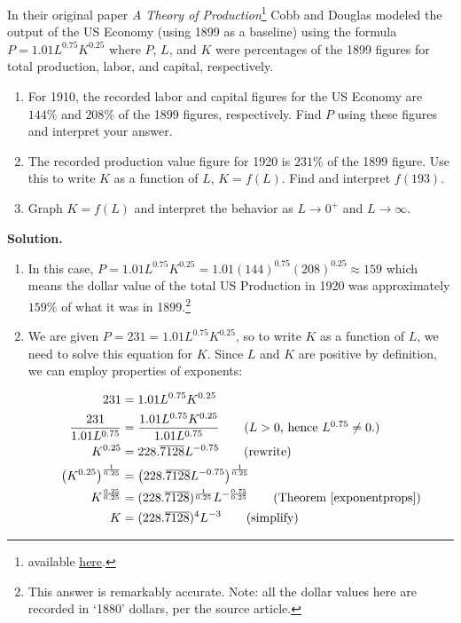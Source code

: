 \begin{ex} \label{CobbDouglasEx}  In their original paper \textit{A Theory of Production}\footnote{available \href{http://bit.ly/2dxlstt}{\underline{here}}.} Cobb and Douglas modeled the output of the US Economy (using 1899 as a baseline) using the formula $P = 1.01 L^{0.75} K^{0.25}$ where $P$, $L$, and $K$ were percentages of the 1899 figures for total production, labor, and capital, respectively.

\begin{enumerate}

\item  For 1910, the recorded labor and capital figures for the US Economy are $144 \%$ and $208 \%$ of the 1899 figures, respectively.  Find $P$ using these figures and interpret your answer.

\item  The recorded production value figure for 1920 is $231 \%$ of the 1899 figure.  Use this to write $K$ as a function of $L$, $K = f(L)$.  Find and interpret $f(193)$.

\item  Graph $K = f(L)$ and interpret the behavior as $L \rightarrow 0^{+}$ and $L \rightarrow \infty$.


\end{enumerate}

{\bf Solution.}

\begin{enumerate}

\item  In this case, $P = 1.01 L^{0.75} K^{0.25} = 1.01 (144)^{0.75} (208)^{0.25} \approx 159$ which means the dollar value of the total US Production in 1920 was approximately $159 \%$ of what it was in 1899.\footnote{This answer is remarkably accurate. Note:  all the dollar values here are recorded in `1880' dollars, per the source article. }  

\item We are given $P = 231 = 1.01L^{0.75} K^{0.25}$, so to write $K$ as a function of $L$, we need to solve this equation for $K$.  Since $L$ and $K$ are positive by definition, we can employ properties of exponents:

\begin{align*}
231 & = 1.01 L^{0.75} K^{0.25} \\
\dfrac{231}{1.01 L^{0.75}} & = \dfrac{1.01 L^{0.75} K^{0.25}}{1.01 L^{0.75}} \tag{$L>0$, hence $L^{0.75} \neq 0$.}\\
K^{0.25} & = 228.\overline{7128}L^{-0.75} \tag{rewrite} \\
\left(K^{0.25}\right)^{\frac{1}{0.25}} & = \left(228.\overline{7128}L^{-0.75}\right)^{\frac{1}{0.25}} \\
K^{\frac{0.25}{0.25}} & = (228.\overline{7128})^{\frac{1}{0.25}} L^{-\frac{0.75}{0.25}} \tag{Theorem  \ref{exponentprops}} \\
K & = (228.\overline{7128})^{4} L^{-3} \tag{simplify}
\end{align*}


\end{enumerate}
\end{ex}
